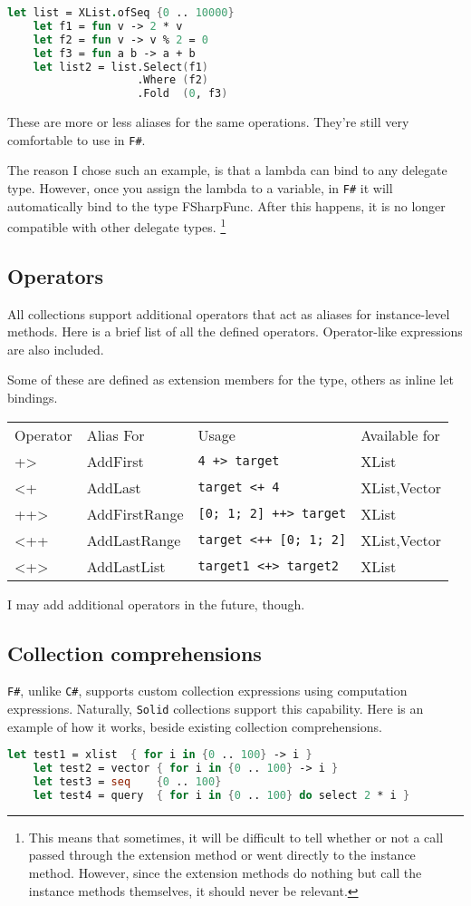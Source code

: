\documentclass[]{article}
\newcommand{\codeformat}{\ttfamily}
\newcommand{\classformat}{\codeformat\color{olive}}
\newcommand{\operatorformat}{\codeformat\color{red}}
\newcommand{\oper}[1]{{\operatorformat #1}}
\newcommand{\class}[1]{{\classformat #1}}
\newcommand{\code}[1]{\mbox{\texttt{#1}}}
\newcommand{\solid}{\texttt{Solid}\xspace}
\newcommand{\fsh}{\texttt{F\#}\xspace}
\newcommand{\csh}{\texttt{C\#}\xspace}
\begin{document}
\begin{lstlisting}[language=fsharp]
	let list = XList.ofSeq {0 .. 10000}
	let f1 = fun v -> 2 * v
	let f2 = fun v -> v % 2 = 0
	let f3 = fun a b -> a + b
	let list2 = list.Select(f1)
					.Where (f2)
					.Fold  (0, f3)
\end{lstlisting}
These are more or less aliases for the same operations. They're still very comfortable to use in \fsh.

The reason I chose such an example, is that a lambda can bind to any delegate type. However, once you assign the lambda to a variable, in \fsh it will automatically bind to the type \class{FSharpFunc}. After this happens, it is no longer compatible with other delegate types. \footnote{This means that sometimes, it will be difficult to tell whether or not a call passed through the extension method or went directly to the instance method. However, since the extension methods do nothing but call the instance methods themselves, it should never be relevant.}
\subsection{Operators}\label{sec:fsh-operators}
All collections support additional operators that act as aliases for instance-level methods. Here is a brief list of all the defined operators. Operator-like expressions are also included.

Some of these are defined as extension members for the type, others as inline let bindings.
\begin{center}
\ttfamily
\begin{tabu}{llll}
Operator & Alias For & Usage & Available for \\
\oper{+>} & AddFirst & \code{4 +> target} & XList\\
\oper{<+} & AddLast & \code{target <+ 4} & XList,Vector\\
\oper{++>} & AddFirstRange & \code{[0; 1; 2] ++> target} & XList\\
\oper{<++} & AddLastRange & \code{target <++ [0; 1; 2]} & XList,Vector\\
\oper{<+>} & AddLastList & \code{target1 <+> target2} & XList \\
\end{tabu}
\end{center}

I may add additional operators in the future, though.

\subsection{Collection comprehensions}
\fsh, unlike \csh, supports custom collection expressions using computation expressions. Naturally, \solid collections support this capability. Here is an example of how it works, beside existing collection comprehensions.
\begin{lstlisting}[language=fsharp]
	let test1 = xlist  { for i in {0 .. 100} -> i }
	let test2 = vector { for i in {0 .. 100} -> i }
	let test3 = seq    {0 .. 100}
	let test4 = query  { for i in {0 .. 100} do select 2 * i }
\end{lstlisting} 
\end{document}
